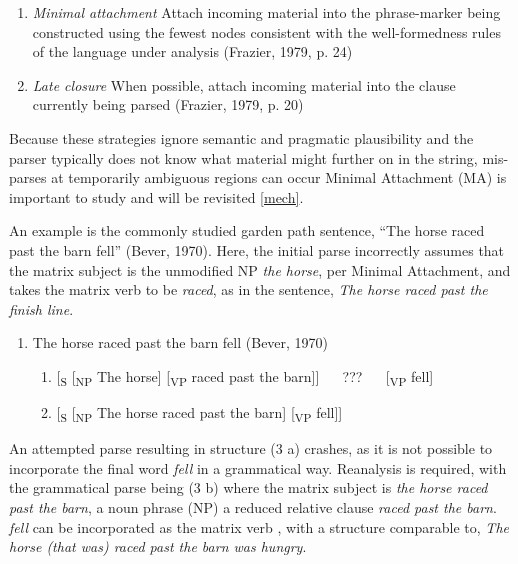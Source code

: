 \documentclass[12pt,oneside]{book}
\providecommand{\tightlist}{%
  \setlength{\itemsep}{0pt}\setlength{\parskip}{0pt}}
\begin{document}
\begin{enumerate}
\def\labelenumi{(\arabic{enumi})}
\item
  \emph{Minimal attachment}
  Attach incoming material into the phrase-marker being constructed using the fewest nodes consistent with the well-formedness rules of the language under analysis (Frazier, 1979, p. 24)
\item
  \emph{Late closure}
  When possible, attach incoming material into the clause currently being parsed (Frazier, 1979, p. 20)
\end{enumerate}

Because these strategies ignore semantic and pragmatic plausibility and the parser typically does not know what material might  further on in the  string, mis-parses at temporarily ambiguous regions can occur Minimal Attachment (MA) is important to  study and will be revisited  \ref{mech}.

An example is the commonly studied garden path sentence, ``The horse raced past the barn fell'' (Bever, 1970). Here, the initial parse incorrectly assumes that the matrix subject is the unmodified NP \emph{the horse}, per Minimal Attachment, and takes the matrix verb to be \emph{raced}, as in the sentence, \emph{The horse raced past the finish line}.

\begin{enumerate}
\def\labelenumi{(\arabic{enumi})}
\setcounter{enumi}{2}
\tightlist
\item
  The horse raced past the barn fell (Bever, 1970)

  \begin{enumerate}
  \def\labelenumii{\alph{enumii})}
  \tightlist
  \item
    {[}\textsubscript{S} {[}\textsubscript{NP} The horse{]} {[}\textsubscript{VP} raced past the barn{]}{]}   ???   {[}\textsubscript{VP} fell{]}
  \item
    {[}\textsubscript{S} {[}\textsubscript{NP} The horse raced past the barn{]} {[}\textsubscript{VP} fell{]}{]}
  \end{enumerate}
\end{enumerate}

An attempted parse resulting in structure (3 a) crashes, as it is not possible to incorporate the final word \emph{fell} in a grammatical way. Reanalysis is required, with the grammatical parse being (3 b) where the matrix subject is \emph{the horse raced past the barn}, a noun phrase (NP)  a reduced relative clause \emph{raced past the barn}.  \emph{fell} can be incorporated as the matrix verb , with a structure comparable to, \emph{The horse (that was) raced past the barn was hungry}.
\end{document}
